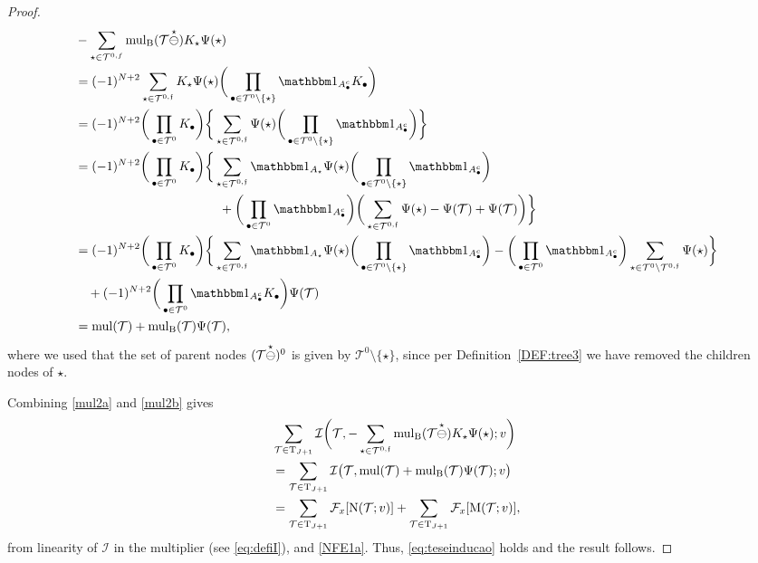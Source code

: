 \documentclass[%
11pt,  reqno]{amsart}
\makeatletter
\newcommand{\5}{\textup{V}}
\newcommand{\noi}{\noindent}
\newcommand{\ind}{\mathbbm 1}
\theoremstyle{remark}
\newcommand{\bul}{\bullet}
\newcommand{\TT}{\mathcal{T}}
\newcommand{\Tr}{\mathrm{T}}
\newcommand{\Ft}{{\mathcal{F}}}
\newcommand{\ff}{\mathfrak{f}}
\DeclareMathOperator{\mul}{mul}
\DeclareMathOperator{\mulB}{mul_{\BB}}
\def\<#1>{\csname MH@symb@#1\endcsname}
\newcommand{\Ical}{\mathcal{I}}
\numberwithin{equation}{section}
\numberwithin{theorem}{section}
\newcommand{\MM}{\mathrm{M}}
\newcommand{\NN}{\mathrm{N}}
\newcommand{\BB}{\mathrm{B}}
\makeatother
\begin{document}
\begin{proof}
\noi
\begin{align}
\label{mul2b}
\begin{split}
& 
-\sum_{\star\in\TT^{0,f}}
\mulB(\TT \overset{\star}{\ominus}  \<1> ) K_\star \Psi(\star)
\\
&
=
(-1)^{ N+2} \sum_{\star\in \TT^{0,\ff}} K_\star \Psi(\star)\bigg( \prod_{\bul \in \TT^0 \setminus \{\star\}} \ind_{A_\bul^c} K_\bul  \bigg)
\\
& =
(-1)^{ N+2} \bigg( \prod_{\bul \in \TT^0} K_\bul \bigg)
\bigg\{ \sum_{\star \in \TT^{0,\ff}} \Psi(\star) \bigg(\prod_{\bul \in \TT^0 \setminus\{\star\}} \ind_{A^c_\bul}  \bigg) \bigg\}
\\
& = (-1)^{ N+2} \bigg( \prod_{\bul \in \TT^0} K_\bul \bigg)
\bigg\{ \sum_{\star \in \TT^{0,\ff}} \ind_{A_\star} \Psi(\star) \bigg(\prod_{\bul \in \TT^0 \setminus\{\star\}} \ind_{A^c_\bul}\bigg)\\
& \hspace{4cm}
+ \bigg(\prod_{\bul\in \TT^0} \ind_{A_\bul^c} \bigg) \bigg(\sum_{\star\in \TT^{0,\ff}}\Psi(\star) - \Psi(\TT) + \Psi(\TT)
\bigg)  \bigg\}
\\
& =
(-1)^{ N+2} \bigg( \prod_{\bul \in \TT^0} K_\bul \bigg) \bigg\{ \sum_{\star \in \TT^{0,\ff}} \ind_{A_\star} \Psi(\star) \bigg( \prod_{\bul \in \TT^{0} \setminus \{\star\}} \ind_{A_\bul^c} \bigg) - \bigg(\prod_{\bul\in \TT^0} \ind_{A_\bul^c} \bigg) \sum_{\star \in \TT^{0} \setminus \TT^{0,\ff}} \Psi(\star) \bigg\} \\
&
\quad + (-1)^{ N+2} \bigg(\prod_{\bul \in \TT^0} \ind_{A^c_\bul} K_\bul \bigg) \Psi(\TT) \\
&  = \mul(\TT) + \mulB(\TT) \Psi(\TT),
\end{split}
\end{align}
where we used that the set of parent nodes $(\TT \overset{\star}{\ominus} \<1>)^0$ is given by $\TT^0 \setminus\{\star\}$, since per Definition~\ref{DEF:tree3} we have removed the children nodes of $\star$.


Combining \eqref{mul2a} and \eqref{mul2b} gives
\begin{align}
& \sum_{\TT\in \Tr_{J+1}}
\Ical 
\bigg(\TT,
-\sum_{\star\in\TT^{0,\ff}}
\mulB(\TT \overset{\star}{\ominus}  \<1> ) K_\star \Psi(\star) ;
v
\bigg) 
\\
&
=
\sum_{\TT\in \Tr_{J+1}}  \Ical \big(\TT, \mul(\TT) + \mulB(\TT) \Psi(\TT) ; v \big) 
 \\
& 
= 
 \sum_{\TT\in \Tr_{J+1}}  \Ft_x [\NN(\TT ; v ) ]
+  \sum_{\TT\in \Tr_{J+1}} \Ft_x [\MM(\TT ; v ) ] 
, 
\end{align}
from linearity of $\Ical$ in the multiplier (see \eqref{eq:defiI}), and \eqref{NFE1a}. Thus, \eqref{eq:teseinducao} holds and the result follows. \qedhere



\end{proof}
\end{document}
